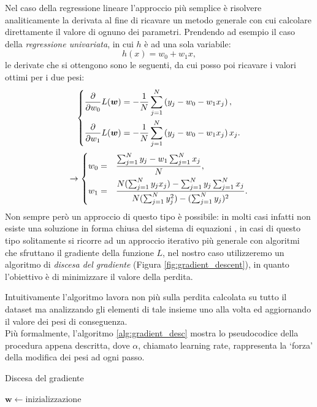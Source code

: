 \documentclass[../../main.tex]{subfiles}
\begin{document}
    Nel caso della regressione lineare l'approccio più semplice è risolvere analiticamente la derivata al fine di ricavare un metodo generale con cui calcolare direttamente il valore di ognuno dei parametri. Prendendo ad esempio il caso della \textit{regressione univariata}, in cui $h$ è ad una sola variabile:
    \[h(x) = w_0 + w_1 x ,\]
    le derivate che si ottengono sono le seguenti, da cui posso poi ricavare i valori ottimi per i due pesi:
    \begin{equation}
        \begin{dcases}
            \frac{\partial}{\partial w_0} L(\boldsymbol{w}) = -\frac{1}{N}\sum_{j=1}^N\left(y_j - w_0 - w_1 x_j\right),\\
            \frac{\partial}{\partial w_1} L(\boldsymbol{w}) = -\frac{1}{N}\sum_{j=1}^N\left(y_j - w_0 - w_1 x_j\right) x_j.
        \end{dcases}   
        \label{eqn:regrLineareDer}      
    \end{equation}
    \[
    \rightarrow
    \begin{dcases}
        w_0 = & \frac{\sum_{j=1}^N y_j - w_1 \sum_{j=1}^N x_j}{N},\\
        w_1 = & \frac{N(\sum_{j=1}^N y_jx_j) - \sum_{j=1}^N y_j \sum_{j=1}^N x_j}{N(\sum_{j=1}^N y_j^2) - (\sum_{j=1}^N y_j)^2}. 
    \end{dcases}    
    \]
    Non sempre però un approccio di questo tipo è possibile: in molti casi infatti non esiste una soluzione in forma chiusa del sistema di equazioni , in casi di questo tipo solitamente si ricorre ad un approccio iterativo più generale con algoritmi che sfruttano il gradiente della funzione $L$, nel nostro caso utilizzeremo un algoritmo di \textit{discesa del gradiente} (Figura \ref{fig:gradient_descent}), in quanto l'obiettivo è di minimizzare il valore della perdita.

    Intuitivamente l'algoritmo lavora non più sulla perdita calcolata su tutto il dataset ma analizzando gli elementi di tale insieme uno alla volta ed aggiornando il valore dei pesi di conseguenza.\\
    Più formalmente, l'algoritmo \ref{alg:gradient_desc} mostra lo pseudocodice della procedura appena descritta, dove $\alpha$, chiamato learning rate, rappresenta la `forza' della modifica dei pesi ad ogni passo.

    \begin{algorithm}[H]
        \caption{Discesa del gradiente}\label{alg:gradient_desc}
        \begin{algorithmic}
            \State $\boldsymbol{w} \gets \text{inizializzazione}$
            \EndWhile
        \end{algorithmic}
    \end{algorithm}  
\end{document}
